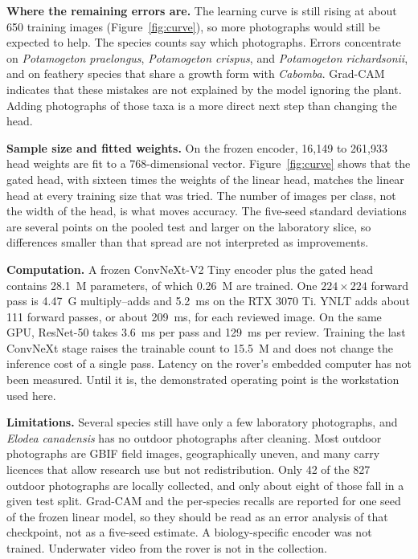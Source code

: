 \documentclass[final,3p,times,twocolumn]{elsarticle}
\begin{document}
\textbf{Where the remaining errors are.}
The learning curve is still rising at about 650 training images (Figure~\ref{fig:curve}), so more photographs would still be expected to help. The species counts say which photographs. Errors concentrate on \emph{Potamogeton praelongus}, \emph{Potamogeton crispus}, and \emph{Potamogeton richardsonii}, and on feathery species that share a growth form with \emph{Cabomba}. Grad-CAM indicates that these mistakes are not explained by the model ignoring the plant. Adding photographs of those taxa is a more direct next step than changing the head.

\textbf{Sample size and fitted weights.}
On the frozen encoder, 16{,}149 to 261{,}933 head weights are fit to a 768-dimensional vector. Figure~\ref{fig:curve} shows that the gated head, with sixteen times the weights of the linear head, matches the linear head at every training size that was tried. The number of images per class, not the width of the head, is what moves accuracy. The five-seed standard deviations are several points on the pooled test and larger on the laboratory slice, so differences smaller than that spread are not interpreted as improvements.

\textbf{Computation.}
A frozen ConvNeXt-V2 Tiny encoder plus the gated head contains 28.1~M parameters, of which 0.26~M are trained. One \(224\times 224\) forward pass is 4.47~G multiply--adds and 5.2~ms on the RTX 3070 Ti. YNLT adds about 111 forward passes, or about 209~ms, for each reviewed image. On the same GPU, ResNet-50 takes 3.6~ms per pass and 129~ms per review. Training the last ConvNeXt stage raises the trainable count to 15.5~M and does not change the inference cost of a single pass. Latency on the rover's embedded computer has not been measured. Until it is, the demonstrated operating point is the workstation used here.

\textbf{Limitations.}
Several species still have only a few laboratory photographs, and \emph{Elodea canadensis} has no outdoor photographs after cleaning. Most outdoor photographs are GBIF field images, geographically uneven, and many carry licences that allow research use but not redistribution. Only 42 of the 827 outdoor photographs are locally collected, and only about eight of those fall in a given test split. Grad-CAM and the per-species recalls are reported for one seed of the frozen linear model, so they should be read as an error analysis of that checkpoint, not as a five-seed estimate. A biology-specific encoder was not trained. Underwater video from the rover is not in the collection.
\end{document}
